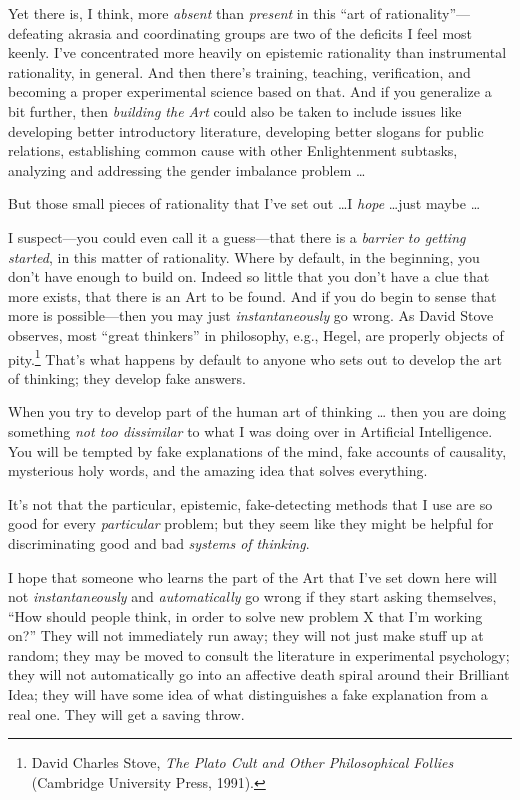 {
 Yet there is, I think, more \textit{absent} than \textit{present}
in this ``art of
rationality''---defeating akrasia and coordinating
groups are two of the deficits I feel most keenly. I've
concentrated more heavily on epistemic rationality than instrumental
rationality, in general. And then there's training,
teaching, verification, and becoming a proper experimental science
based on that. And if you generalize a bit further, then
\textit{building the Art} could also be taken to include issues like
developing better introductory literature, developing better slogans
for public relations, establishing common cause with other
Enlightenment subtasks, analyzing and addressing the gender imbalance
problem \ldots}

{
 But those small pieces of rationality that I've
set out \ldots I \textit{hope} \ldots just maybe \ldots}

{
 I suspect---you could even call it a guess---that there is a
\textit{barrier to getting started}, in this matter of rationality.
Where by default, in the beginning, you don't have
enough to build on. Indeed so little that you don't
have a clue that more exists, that there is an Art to be found. And if
you do begin to sense that more is possible---then you may just
\textit{instantaneously} go wrong. As David Stove observes, most
``great thinkers'' in philosophy,
e.g., Hegel, are properly objects of pity.\footnote{David Charles Stove, \textit{The Plato Cult and Other
Philosophical Follies} (Cambridge University Press, 1991).}
That's what happens by default to anyone who sets out
to develop the art of thinking; they develop fake answers.}

{
 When you try to develop part of the human art of thinking \ldots
then you are doing something \textit{not too dissimilar} to what I was
doing over in Artificial Intelligence. You will be tempted by fake
explanations of the mind, fake accounts of causality, mysterious holy
words, and the amazing idea that solves everything.}

{
 It's not that the particular, epistemic,
fake-detecting methods that I use are so good for every
\textit{particular} problem; but they seem like they might be helpful
for discriminating good and bad \textit{systems of thinking}.}

{
 I hope that someone who learns the part of the Art that
I've set down here will not \textit{instantaneously}
and \textit{automatically} go wrong if they start asking themselves,
``How should people think, in order to solve new
problem X that I'm working on?'' They
will not immediately run away; they will not just make stuff up at
random; they may be moved to consult the literature in experimental
psychology; they will not automatically go into an affective death
spiral around their Brilliant Idea; they will have some idea of what
distinguishes a fake explanation from a real one. They will get a
saving throw.}

